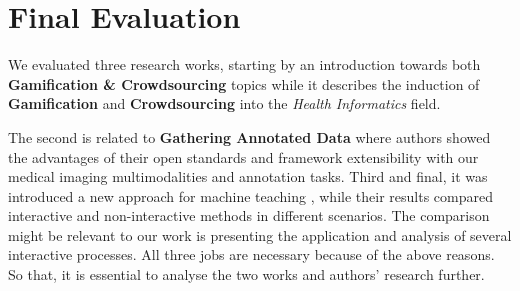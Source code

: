 \section{Final Evaluation}

We evaluated three research works, starting by an introduction towards both \textbf{Gamification \& Crowdsourcing} \cite{dumitrache2013dr, aroyo2013crowd} topics while it describes the induction of \textbf{Gamification} and \textbf{Crowdsourcing} into the \textit{Health Informatics} field.

The second is related to \textbf{Gathering Annotated Data} \cite{inel2014crowdtruth} where authors showed the advantages of their open standards and framework extensibility with our medical imaging multimodalities and annotation tasks. Third and final, it was introduced a new approach for machine teaching \cite{zhu2013machine}, while their results compared interactive and non-interactive methods in different scenarios. The comparison might be relevant to our work is presenting the application and analysis of several interactive processes. All three jobs are necessary because of the above reasons. So that, it is essential to analyse the two works and authors' research further.
